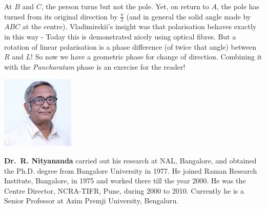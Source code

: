 At $B$ and $C$, the person turns but not the pole. Yet, on return to $A$, the pole
has turned from its original direction by $\frac{\pi}{2}$ (and in general the solid angle made
by $ABC$ at the centre). Vladimirskii's insight was that polarisation behaves
exactly in this way - Today this is demonstrated nicely using optical fibres.
But a rotation of linear polarisation is a phase difference (of twice that angle)
between $R$ and $L$! So now we have a geometric phase for change of direction.
Combining it with the \textit{Pancharatam} phase is an exercise for the reader!
\vskip 1cm


\centerline{\includegraphics[scale=0.9]{authorsphotos/Prof_Rajaram_Nityananda.jpg}} 
\bigskip

\noindent
\textbf{Dr.\ R. Nityananda} carried out his research at NAL, Bangalore, and obtained the Ph.D. degree from Bangalore University in 1977. He joined Raman Research Institute, Bangalore, in 1975 and worked there till the year 2000.  He was the Centre Director, NCRA-TIFR, Pune, during 2000 to 2010. Currently he is a Senior Professor at Azim Premji University, Bengaluru.
